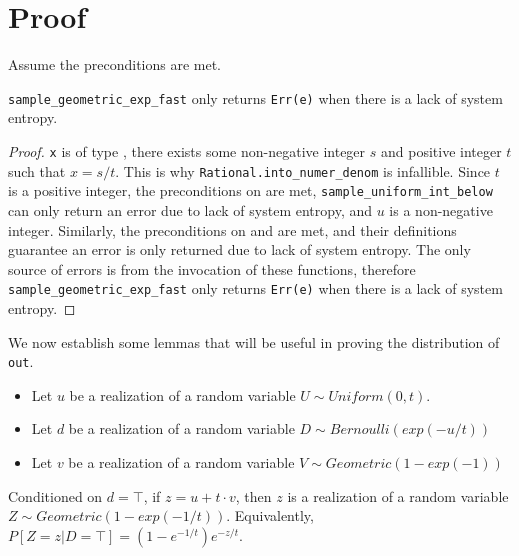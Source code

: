 \documentclass{article}
\begin{document}
\section{Proof}
Assume the preconditions are met.

\begin{lemma}\label{err-e}
    \texttt{sample\_geometric\_exp\_fast} only returns \texttt{Err(e)} when there is a lack of system entropy.
\end{lemma}

\begin{proof}
    \texttt{x} is of type , there exists some non-negative integer $s$ and positive integer $t$ such that $x = s/t$.
    This is why \texttt{Rational.into\_numer\_denom} is infallible.
    Since $t$ is a positive integer, the preconditions on  are met, 
    \texttt{sample\_uniform\_int\_below} can only return an error due to lack of system entropy, and $u$ is a non-negative integer.
    Similarly, the preconditions on  and  are met,
    and their definitions guarantee an error is only returned due to lack of system entropy.
    The only source of errors is from the invocation of these functions,
    therefore \texttt{sample\_geometric\_exp\_fast} only returns \texttt{Err(e)} when there is a lack of system entropy.
\end{proof}

We now establish some lemmas that will be useful in proving the distribution of \texttt{out}.

\begin{itemize}
    \item Let $u$ be a realization of a random variable $U \sim Uniform(0, t)$.
    \item Let $d$ be a realization of a random variable $D \sim Bernoulli(exp(-u/t))$
    \item Let $v$ be a realization of a random variable $V \sim Geometric(1 - exp(-1))$
\end{itemize}

\begin{lemma}\label{geom_1_t}\cite{CKS20}
    Conditioned on $d = \top$, if $z = u + t \cdot v$, 
    then $z$ is a realization of a random variable $Z \sim Geometric(1 - exp(-1/t))$. 
    Equivalently, $P[Z=z | D=\top] = (1 - e^{-1/t}) e^{-z/t}$.
\end{lemma}
\end{document}
